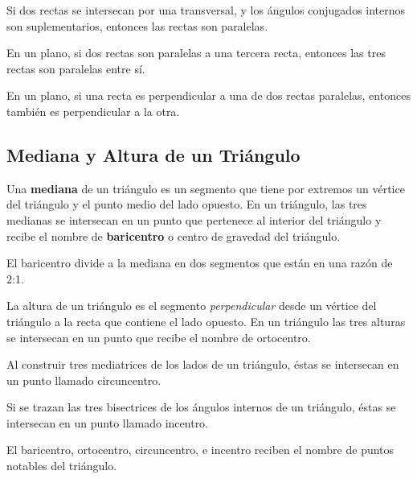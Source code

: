 \begin{theorem}
    Si dos rectas se intersecan por una transversal, y los ángulos conjugados internos son suplementarios, entonces las rectas son paralelas.
\end{theorem}

\begin{theorem}
    En un plano, si dos rectas son paralelas a una tercera recta, entonces las tres rectas son paralelas entre sí.
\end{theorem}

\begin{theorem}
    En un plano, si una recta es perpendicular a una de dos rectas paralelas, entonces también es perpendicular a la otra.
\end{theorem}

\subsection{Mediana y Altura de un Triángulo}

\begin{definition}
    Una \textbf{mediana} de un triángulo es un segmento que tiene por extremos un vértice del triángulo  y el punto medio del lado opuesto. En un triángulo, las tres medianas se intersecan en un punto que pertenece al interior del triángulo y recibe el nombre de \textbf{baricentro} o centro de gravedad del triángulo.
\end{definition}

\begin{theorem}
    El baricentro divide a la mediana en dos segmentos que están en una razón de 2:1.
\end{theorem}

\begin{definition}
    La altura de un triángulo es el segmento \textit{perpendicular} desde un vértice del triángulo a la recta que contiene el lado opuesto. En un triángulo las tres alturas se intersecan en un punto que recibe el nombre de ortocentro.
\end{definition}

\begin{definition}
    Al construir tres mediatrices de los lados de un triángulo, éstas se intersecan en un punto llamado circuncentro.
\end{definition}

\begin{definition}
    Si se trazan las tres bisectrices de los ángulos internos de un triángulo, éstas se intersecan en un punto llamado incentro.
\end{definition}

\begin{definition}
    El baricentro, ortocentro, circuncentro, e incentro reciben el nombre de puntos notables del triángulo.    
\end{definition}
